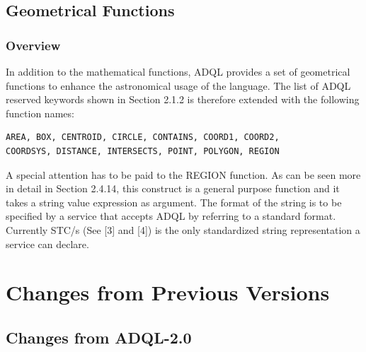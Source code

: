 \documentclass[11pt,a4paper]{ivoa}
\begin{document}
\subsection{Geometrical Functions}
\subsubsection{Overview}

In addition to the mathematical functions, ADQL provides a set of geometrical
functions to enhance the astronomical usage of the language. The list of
ADQL reserved keywords shown in Section 2.1.2 is therefore extended with
the following function names:

\begin{verbatim}
AREA, BOX, CENTROID, CIRCLE, CONTAINS, COORD1, COORD2,
COORDSYS, DISTANCE, INTERSECTS, POINT, POLYGON, REGION
\end{verbatim}

A special attention has to be paid to the REGION function. As can be seen more
in detail in Section 2.4.14, this construct is a general purpose function and
it takes a string value expression as argument. The format of the string is
to be specified by a service that accepts ADQL by referring to a standard
format. Currently STC/s (See [3] and [4]) is the only standardized string
representation a service can declare.



\appendix

\section{Changes from Previous Versions}

\subsection{Changes from ADQL-2.0}





\end{document}
